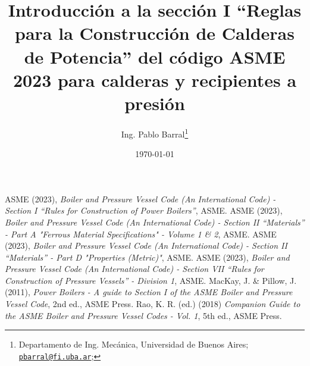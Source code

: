 \documentclass[10pt,a4paper]{article}
\title{Introducción a la sección I ``Reglas para la Construcción de Calderas de Potencia'' del código ASME 2023 para calderas y recipientes a presión}
\author{Ing. Pablo Barral\thanks{Departamento de Ing. Mecánica, Universidad de Buenos Aires; 
     \href{mailto:pbarral@fi.uba.ar}{\texttt{pbarral@fi.uba.ar}};
     \raisebox{0.25ex}{\href{https://www.linkedin.com/in/pablo-barral}{\texttt{[image: linkedin\_logo.png]}}}}
     }
\affil{Sistemas de Almacenamiento}
\date{\today}
\begin{document}
     
     
     \newpage
     \tableofcontents
        
     
     
     
     
     \newpage
     \begin{thebibliography}{9}
          ASME (2023), \emph{Boiler and Pressure Vessel Code (An International Code) - Section I ``Rules for Construction of Power Boilers''}, ASME.
          ASME (2023), \emph{Boiler and Pressure Vessel Code (An International Code) - Section II ``Materials'' - Part A "Ferrous Material Specifications" - Volume 1 \& 2}, ASME.
          ASME (2023), \emph{Boiler and Pressure Vessel Code (An International Code) - Section II ``Materials'' - Part D "Properties (Metric)"}, ASME.
          ASME (2023), \emph{Boiler and Pressure Vessel Code (An International Code) - Section VII ``Rules for Construction of Pressure Vessels'' - Division 1}, ASME.
          MacKay, J. \& Pillow, J. (2011), \emph{Power Boilers - A guide to Section I of the ASME Boiler and Pressure Vessel Code}, 2nd ed., ASME Press.
          Rao, K. R. (ed.) (2018) \emph{Companion Guide to the ASME Boiler and Pressure Vessel Codes - Vol. 1}, 5th ed., ASME Press.     
     \end{thebibliography}
\end{document}
